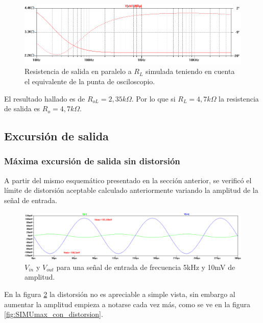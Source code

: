 \documentclass[10pt,spanish,a4paper,notitlepage]{article}
\begin{document}
\begin{figure}[H]
\centering
\includegraphics[scale=0.6]{senales/simulacion-Ro.png}
\caption{Resistencia de salida en paralelo a $R_L$ simulada teniendo en cuenta el equivalente de la punta de osciloscopio.}
\label{fig:SIMURo_con_punta}
\end{figure}

El resultado hallado es de $R_{oL}=2,35\unit{k\Omega}$.
Por lo que si $R_L = 4,7\unit{k\Omega}$ la resistencia
de salida es $R_o = 4,7\unit{k\Omega}$.


\subsection{Excursión de salida}

\subsubsection{Máxima excursión de salida sin distorsión}

A partir del mismo esquemático presentado en la sección anterior, se verificó el
límite de distorsión aceptable calculado anteriormente variando la amplitud de la
señal de entrada.


\begin{figure}[H]
\centering
\includegraphics[scale=0.45]{senales/simulacion-max-exc-sin-distorsion.png}
\caption{$V_{in}$ y $V_{out}$  para una señal de entrada de frecuencia 5\unit{kHz} y 10\unit{mV} de amplitud.}
\label{fig:SIMUmax_sin_distorsion}
\end{figure}


En la figura \ref{fig:SIMUmax_sin_distorsion} la distorsión no es apreciable a simple vista, sin embargo al aumentar  la amplitud empieza a notarse cada vez más, como se ve en la figura \ref{fig:SIMUmax_con_distorsion}.
\end{document}
